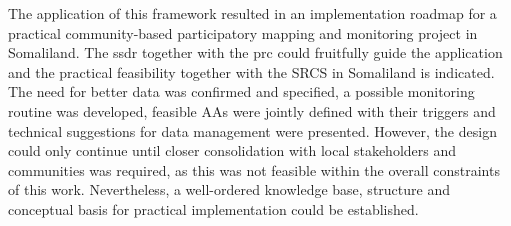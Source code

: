 The application of this framework resulted in an implementation roadmap for a practical community-based participatory mapping and monitoring project in Somaliland. The \acrshort{ssdr} together with the \acrshort{prc} could fruitfully guide the application and the practical feasibility together with the SRCS in Somaliland is indicated. The need for better data was confirmed and specified, a possible monitoring routine was developed, feasible AAs were jointly defined with their triggers and technical suggestions for data management were presented. However, the design could only continue until closer consolidation with local stakeholders and communities was required, as this was not feasible within the overall constraints of this work. Nevertheless, a well-ordered knowledge base, structure and conceptual basis for practical implementation could be established.
